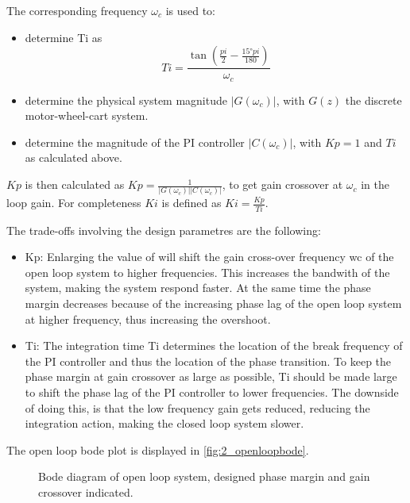 \documentclass[a4paper]{article}
\newcommand{\newpar}{\vspace{.3cm}\noindent}
\begin{document}
\newpar
The corresponding frequency \(\omega_{c}\) is used to:

\begin{itemize}
    \item determine Ti as 
        \begin{equation}
            Ti = \frac{\tan \left( \frac{pi}{2} - \frac{15° pi}{180} \right)}{\omega_{c}}
        \end{equation}
    \item determine the physical system magnitude \( |G(\omega_{c})| \), with \(G(z)\) the discrete motor-wheel-cart system.
    \item determine the magnitude of the PI controller \( |C(\omega_{c})| \), with \(Kp = 1\) and \(Ti\) as calculated above.
\end{itemize}

\newpar
\(Kp\) is then calculated as \(Kp = \frac{1}{|G(\omega_{c})||C(\omega_{c})|} \), to get gain crossover at \(\omega_{c} \) in the loop gain. For completeness \(Ki\) is defined as \(Ki = \frac{Kp}{Ti} \).

\newpar
The trade-offs involving the design parametres are the following:

\begin{itemize}
    \item Kp: Enlarging the value of will shift the gain cross-over frequency wc of the open loop system to higher frequencies. This increases the bandwith of the system, making the system respond faster. At the same time the phase margin decreases because of the increasing phase lag of the open loop system at higher frequency, thus increasing the overshoot.
    \item Ti: The integration time Ti determines the location of the break frequency of the PI controller and thus the location of the phase transition. To keep the phase margin at gain crossover as large as possible, Ti should be made large to shift the phase lag of the PI controller to lower frequencies. The downside of doing this, is that the low frequency gain gets reduced, reducing the integration action, making the closed loop system slower.
\end{itemize}

\newpar
The open loop bode plot is displayed in \autoref{fig:2_openloopbode}.

\begin{figure}[H]
    \caption{Bode diagram of open loop system, designed phase margin and gain crossover indicated.}
    \label{fig:2_openloopbode}
\end{figure}
\end{document}
